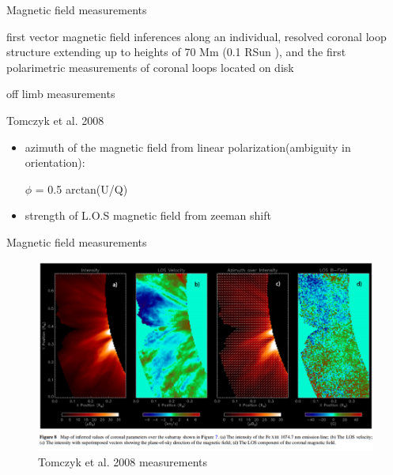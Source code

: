 \documentclass{beamer}
\begin{document}
\begin{frame}{Magnetic field measurements}

 first vector
magnetic field inferences along an individual, resolved coronal
loop structure extending up to heights of 70 Mm (0.1 RSun ), and
the first polarimetric measurements of coronal loops located on
disk

off limb measurements

Tomczyk et al. 2008
 
\begin{itemize}
\item azimuth of the magnetic field from linear polarization(ambiguity in orientation): 

$\phi$ = 0.5 arctan(U/Q)



\item strength of L.O.S  magnetic field from zeeman shift
\end{itemize}

\end{frame}

\begin{frame}{Magnetic field measurements}
 
\begin{figure}[H]
 \centering
 \includegraphics[scale=0.35]{t1.png}
\caption{Tomczyk et al. 2008 measurements}
\end{figure}



\end{frame}
\end{document}
